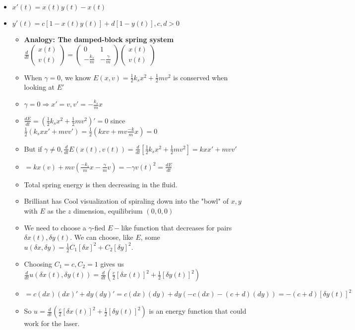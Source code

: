 \documentclass[11pt, oneside]{article}   	%
\begin{document}
\begin{itemize}
\item $x'(t) = x(t)y(t) - x(t)$
\item $y'(t) = c[1-x(t)y(t)] + d[1-y(t)], c, d > 0$
\begin{itemize}
\item \textbf{Analogy: The damped-block spring system} $\frac{d}{dt} \begin{pmatrix} x(t) \\ v(t) \end{pmatrix} =  \begin{pmatrix} 0 & 1 \\ -\frac{k_s}{m} & -\frac{\gamma}{m} \end{pmatrix}  \begin{pmatrix}x(t) \\ v(t)\end{pmatrix}$ 
\item When $\gamma = 0$, we know $E(x,v) = \frac{1}{2}k_sx^2 + \frac{1}{2}mv^2$ is conserved when looking at $E'$
\item $\gamma = 0 \Rightarrow x' = v, v' = -\frac{k_s}{m}x$
\item $\frac{dE}{dt} = ( \frac{1}{2}k_sx^2 + \frac{1}{2}mv^2)' = 0$ since $\frac{1}{2}(k_s xx' + mvv' ) = \frac{1}{2}(kxv + mv\frac{-k}{m}x) = 0$
\item But if $\gamma \neq 0, \frac{d}{dt}E(x(t), v(t)) = \frac{d}{dt}[ \frac{1}{2}k_sx^2 + \frac{1}{2}mv^2] = kxx' + mvv'$
\item $= kx(v) + mv(\frac{-k_s}{m}x - \frac{\gamma}{m}v) = -\gamma v(t)^2 = \frac{dE}{dt}$
\item Total spring energy is then decreasing in the fluid.
\item Brilliant has Cool visualization of spiraling down into the "bowl" of $x,y$ with $E$ as the $z$ dimension, equilibrium $(0,0, 0)$
\item We need to choose a $\gamma$-fied $E-$like function that decreases for pairs $\delta x(t), \delta y(t)$. We can choose, like $E$, some $u(\delta x, \delta y) = \frac{1}{2}C_1[\delta x]^2 + C_2[\delta y]^2$.
\item Choosing $C_1 = c, C_2 = 1$ gives us $\frac{d}{dt}u(\delta x(t), \delta y(t)) = \frac{d}{dt}(\frac{c}{2}[\delta x(t)]^2 + \frac{1}{2}[\delta y(t)]^2)$
\item $= c(dx)(dx)' + dy(dy)' = c (dx)(dy) + dy(-c(dx)-(c+d)(dy)) = -(c+d)[\delta y(t)]^2$
\item So $u =  \frac{d}{dt}(\frac{c}{2}[\delta x(t)]^2 + \frac{1}{2}[\delta y(t)]^2)$ is an energy function that could work for the laser.
\end{itemize}


\end{itemize}
\end{document}

